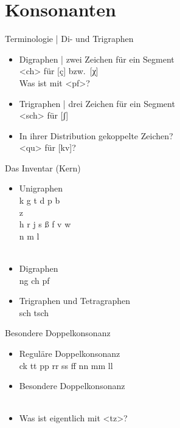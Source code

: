 \section{Konsonanten}

\begin{frame}
  {Terminologie | Di- und Trigraphen}
  \onslide<+->
  \begin{itemize}[<+->]
    \item Digraphen | zwei Zeichen für ein Segment\\
      \Halbzeile
      \alert{<ch>} für [ç] bzw.\ [χ]\\
      \onslide<+->
      \Halbzeile
      Was ist mit \alert{<pf>}?
    \Zeile
    \item Trigraphen | drei Zeichen für ein Segment\\
      \Halbzeile 
      \alert{<sch>} für [ʃ]
    \Zeile
    \item In ihrer Distribution gekoppelte Zeichen?\\
      \Halbzeile
      \alert{<qu>} für [kv]?
  \end{itemize}
\end{frame}

\begin{frame}
  {Das Inventar (Kern)}
  \onslide<+->
  \begin{itemize}[<+->]
    \item Unigraphen\\
    \Halbzeile
    \alert{k g t d p b}\\
    \onslide<+->
    \alert{z}\\
    \onslide<+->
    \alert{h r j s ß f v w}\\
    \onslide<+->
    \alert{n m l}\\
    \Viertelzeile
    \onslide<+->
    \\
    \Zeile
  \item Digraphen\\
    \Halbzeile 
    \alert{ng ch pf}
    \onslide<+->
    \\
    \Zeile
  \item Trigraphen und Tetragraphen\\
    \Halbzeile 
    \alert{sch tsch}
    \onslide<+->
    \\
  \end{itemize}
\end{frame}

\begin{frame}
  {Besondere Doppelkonsonanz}
  \onslide<+->
  \begin{itemize}[<+->]
    \item Reguläre Doppelkonsonanz\\
    \Halbzeile
    \alert{ck tt pp rr ss ff nn mm ll}\\
    \Zeile
    \item Besondere Doppelkonsonanz\\
    \Halbzeile
    \\
    \Zeile
    \item Was ist eigentlich mit \alert{<tz>}?
  \end{itemize}
\end{frame}

